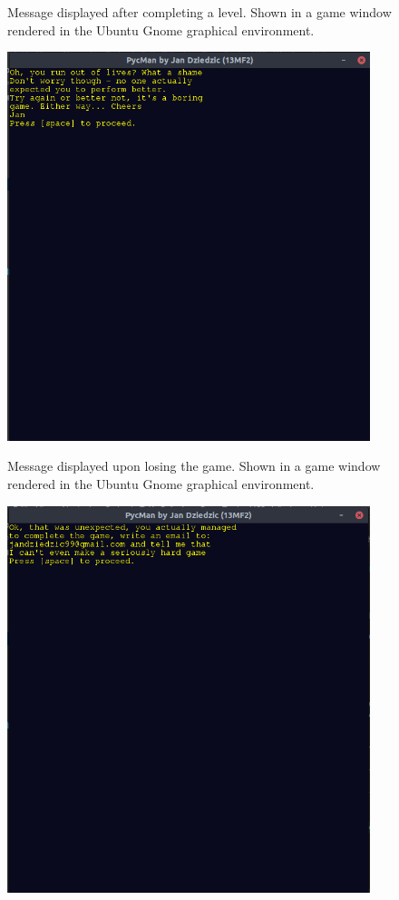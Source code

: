\documentclass[11pt,a4paper,notitlepage]{report}
\newenvironment{img}{
	\begin{center}
		\begin{figure}[H]
			\begin{center}
			
}{
	\end{center}
		\end{figure}
			\end{center}
}
\begin{document}
\begin{center}
\begin{img}
					\caption{Message displayed after completing a level. Shown in a game window rendered in the Ubuntu Gnome graphical environment.}
				\end{img}
				\begin{img}
					\includegraphics[width=300pt]{images/game_over_msg.png}\\
					\caption{Message displayed upon losing the game. Shown in a game window rendered in the Ubuntu Gnome graphical environment.}
				\end{img}
				\begin{img}
					\includegraphics[width=300pt]{images/real_congrats_msg.png}\\

\end{img}
\end{center}
\end{document}

